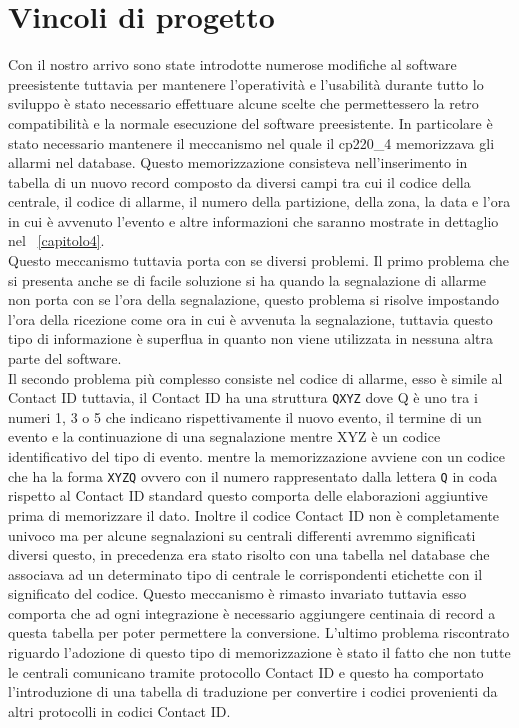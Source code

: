 \section{Vincoli di progetto}
Con il nostro arrivo sono state introdotte numerose modifiche al software preesistente tuttavia per mantenere l'operatività e l'usabilità durante tutto lo sviluppo è stato necessario effettuare alcune scelte che permettessero la retro compatibilità e la normale esecuzione del software preesistente. In particolare è stato necessario mantenere il meccanismo nel quale il cp220\_4 memorizzava gli allarmi nel database. Questo memorizzazione consisteva nell'inserimento in tabella di un nuovo record composto da diversi campi tra cui il codice della centrale, il codice di allarme, il numero della partizione, della zona, la data e l'ora in cui è avvenuto l'evento e altre informazioni che saranno mostrate in dettaglio nel \chaptername~\ref{capitolo4}.\\
Questo meccanismo tuttavia porta con se diversi problemi.
Il primo problema che si presenta anche se di facile soluzione si ha quando la segnalazione di allarme non porta con se l'ora della segnalazione, questo problema si risolve impostando l'ora della ricezione come ora in cui è avvenuta la segnalazione, tuttavia questo tipo di informazione è superflua in quanto non viene utilizzata in nessuna altra parte del software.\\
Il secondo problema più complesso consiste nel codice di allarme, esso è simile al Contact ID tuttavia, il Contact ID ha una struttura \texttt{QXYZ} dove Q è uno tra i numeri 1, 3 o 5 che indicano rispettivamente il nuovo evento, il termine di un evento e la continuazione di una segnalazione mentre XYZ è un codice identificativo del tipo di evento. mentre la memorizzazione avviene con un codice che ha la forma \texttt{XYZQ} ovvero con il numero rappresentato dalla lettera \texttt{Q} in coda rispetto al Contact ID standard questo comporta delle elaborazioni aggiuntive prima di memorizzare il dato. Inoltre il codice Contact ID non è completamente univoco ma per alcune segnalazioni su centrali differenti avremmo significati diversi questo, in precedenza era stato risolto con una tabella nel database che associava ad un determinato tipo di centrale le corrispondenti etichette con il significato del codice. Questo meccanismo è rimasto invariato tuttavia esso comporta che ad ogni integrazione è necessario aggiungere centinaia di record a questa tabella per poter permettere la conversione. L'ultimo problema riscontrato riguardo l'adozione di questo tipo di memorizzazione è stato il fatto che non tutte le centrali comunicano tramite protocollo Contact ID e questo ha comportato l'introduzione di una tabella di traduzione per convertire i codici provenienti da altri protocolli in codici Contact ID.\\
